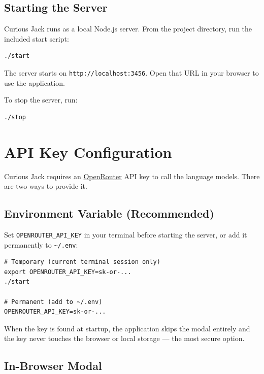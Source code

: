 \documentclass[11pt]{article}
\begin{document}
\subsection{Starting the Server}

Curious Jack runs as a local Node.js server. From the project directory, run
the included start script:

\begin{Verbatim}[fontsize=\small]
./start
\end{Verbatim}

The server starts on \texttt{http://localhost:3456}. Open that URL in your
browser to use the application.

To stop the server, run:

\begin{Verbatim}[fontsize=\small]
./stop
\end{Verbatim}

\section{API Key Configuration}

Curious Jack requires an \href{https://openrouter.ai}{OpenRouter} API key to
call the language models. There are two ways to provide it.

\subsection{Environment Variable (Recommended)}

Set \texttt{OPENROUTER\_API\_KEY} in your terminal before starting the
server, or add it permanently to \texttt{\textasciitilde/.env}:

\begin{Verbatim}[fontsize=\small]
# Temporary (current terminal session only)
export OPENROUTER_API_KEY=sk-or-...
./start

# Permanent (add to ~/.env)
OPENROUTER_API_KEY=sk-or-...
\end{Verbatim}

When the key is found at startup, the application skips the modal entirely
and the key never touches the browser or local storage --- the most secure
option.

\subsection{In-Browser Modal}
\end{document}
